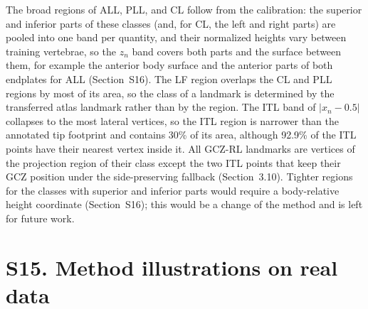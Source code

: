 \documentclass[10pt,a4paper]{article}
\begin{document}
The broad regions of ALL, PLL, and CL follow from the calibration: the superior and inferior parts of these classes (and, for CL, the left and right parts) are pooled into one band per quantity, and their normalized heights vary between training vertebrae, so the $z_n$ band covers both parts and the surface between them, for example the anterior body surface and the anterior parts of both endplates for ALL (Section~S16). The LF region overlaps the CL and PLL regions by most of its area, so the class of a landmark is determined by the transferred atlas landmark rather than by the region. The ITL band of $|x_n-0.5|$ collapses to the most lateral vertices, so the ITL region is narrower than the annotated tip footprint and contains 30\% of its area, although 92.9\% of the ITL points have their nearest vertex inside it. All GCZ-RL landmarks are vertices of the projection region of their class except the two ITL points that keep their GCZ position under the side-preserving fallback (Section~3.10). Tighter regions for the classes with superior and inferior parts would require a body-relative height coordinate (Section~S16); this would be a change of the method and is left for future work.

\begin{table}[h]
\centering
\small
\caption{Candidate regions against expert footprints on the 14 held-out vertebrae (medians; Inside pooled over reference points). Bands: calibrated $\mu_L\pm2\sigma_L$ bands in the fold holding out S03. Area: share of the vertebral surface. Footprint: surface within 2.5~mm of an expert point of the class. Ratio: region area over footprint area. Foot.\ in reg.: share of the footprint area inside the region. Reg.\ on foot.: share of the region area within the footprint. Overlap: share of the region area that also belongs to another class region.}
\label{tab:region_verification}
\end{table}

\section*{S15. Method illustrations on real data}
\end{document}
